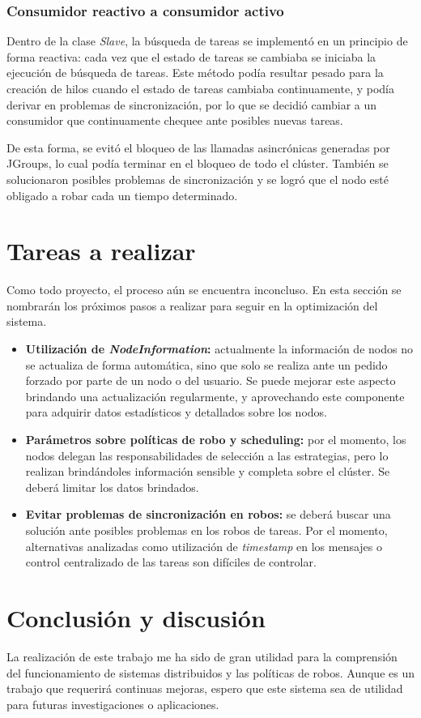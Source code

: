 \documentclass[12pt,a4paper,oneside,spanish]{report}
\begin{document}
\subsubsection*{Consumidor reactivo a consumidor activo}

Dentro de la clase \textit{Slave}, la búsqueda de tareas se implementó en un principio de forma reactiva: cada vez que el estado de tareas se cambiaba se iniciaba la ejecución de búsqueda de tareas. Este método podía resultar pesado para la creación de hilos cuando el estado de tareas cambiaba continuamente, y podía derivar en problemas de sincronización, por lo que se decidió cambiar a un consumidor que continuamente chequee ante posibles nuevas tareas. 

De esta forma, se evitó el bloqueo de las llamadas asincrónicas generadas por JGroups, lo cual podía terminar en el bloqueo de todo el clúster. También se solucionaron posibles problemas de sincronización y se logró que el nodo esté obligado a robar cada un tiempo determinado.

\section*{Tareas a realizar}

Como todo proyecto, el proceso aún se encuentra inconcluso. En esta sección se nombrarán los próximos pasos a realizar para seguir en la optimización del sistema.

\begin{itemize}
	\item \textbf{Utilización de \textit{NodeInformation}:} actualmente la información de nodos no se actualiza de forma automática, sino que solo se realiza ante un pedido forzado por parte de un nodo o del usuario. Se puede mejorar este aspecto brindando una actualización regularmente, y aprovechando este componente para adquirir datos estadísticos y detallados sobre los nodos.
	\item \textbf{Parámetros sobre políticas de robo y scheduling:} por el momento, los nodos delegan las responsabilidades de selección a las estrategias, pero lo realizan brindándoles información sensible y completa sobre el clúster. Se deberá limitar los datos brindados.
	\item \textbf{Evitar problemas de sincronización en robos:} se deberá buscar una solución ante posibles problemas en los robos de tareas. Por el momento, alternativas analizadas como utilización de \textit{timestamp} en los mensajes o control centralizado de las tareas son difíciles de controlar.
\end{itemize}


\section*{Conclusión y discusión}

La realización de este trabajo me ha sido de gran utilidad para la comprensión del funcionamiento de sistemas distribuidos y las políticas de robos. Aunque es un trabajo que requerirá continuas mejoras, espero que este sistema sea de utilidad para futuras investigaciones o aplicaciones.



\end{document}
